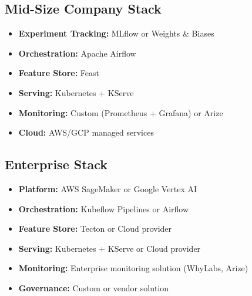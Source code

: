 \subsection{Mid-Size Company Stack}
\begin{itemize}
    \item \textbf{Experiment Tracking:} MLflow or Weights \& Biases
    \item \textbf{Orchestration:} Apache Airflow
    \item \textbf{Feature Store:} Feast
    \item \textbf{Serving:} Kubernetes + KServe
    \item \textbf{Monitoring:} Custom (Prometheus + Grafana) or Arize
    \item \textbf{Cloud:} AWS/GCP managed services
\end{itemize}

\subsection{Enterprise Stack}
\begin{itemize}
    \item \textbf{Platform:} AWS SageMaker or Google Vertex AI
    \item \textbf{Orchestration:} Kubeflow Pipelines or Airflow
    \item \textbf{Feature Store:} Tecton or Cloud provider
    \item \textbf{Serving:} Kubernetes + KServe or Cloud provider
    \item \textbf{Monitoring:} Enterprise monitoring solution (WhyLabs, Arize)
    \item \textbf{Governance:} Custom or vendor solution
\end{itemize}
